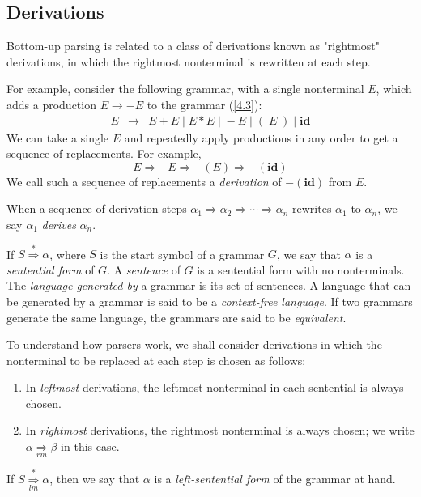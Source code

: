 \documentclass[12pt,a4paper,twoside,openany]{book}
\begin{document}
\subsection{Derivations}

Bottom-up parsing is related to a class of derivations known as "rightmost" derivations, in which the rightmost nonterminal is rewritten at each step.

For example, consider the following grammar, with a single nonterminal $E$, which adds a production $E\to-E$ to the grammar (\ref{4.3}):
\begin{equation}
    \begin{array}{ccc}E&\rightarrow&E+E\;|\;E*E\;|\;-E\;|\;(\;E\;)\;|\;\textbf{id}\end{array}
    \label{4.7}
\end{equation}
We can take a single $E$ and repeatedly apply productions in any order to get a sequence of replacements. For example, $$E\Rightarrow-E\Rightarrow-(E)\Rightarrow-(\textbf{id})$$ We call such a sequence of replacements a \textit{derivation} of $-(\textbf{id})$ from $E$.

When a sequence of derivation steps $\alpha_1\Rightarrow\alpha_2\Rightarrow\cdots\Rightarrow\alpha_n$ rewrites $\alpha_1$ to $\alpha_n$, we say $\alpha_1$ \textit{derives} $\alpha_n$.

If $S\overset{*}{\Rightarrow}\alpha$, where $S$ is the start symbol of a grammar $G$, we say that $\alpha$ is a \textit{sentential form} of $G$. A \textit{sentence} of $G$ is a sentential form with no nonterminals. The \textit{language generated by} a grammar is its set of sentences. A language that can be generated by a grammar is said to be a \textit{context-free language}. If two grammars generate the same language, the grammars are said to be \textit{equivalent}.

To understand how parsers work, we shall consider derivations in which the nonterminal to be replaced at each step is chosen as follows:
\begin{enumerate}
    \item In \textit{leftmost} derivations, the leftmost nonterminal in each sentential is always chosen.
    \item In \textit{rightmost} derivations, the rightmost nonterminal is always chosen; we write $\alpha\underset{rm}{\Rightarrow}\beta$ in this case.
\end{enumerate}

If $S\overset{*}{\underset{lm}{\Rightarrow}}\alpha$, then we say that $\alpha$ is a \textit{left-sentential form} of the grammar at hand.
\end{document}
